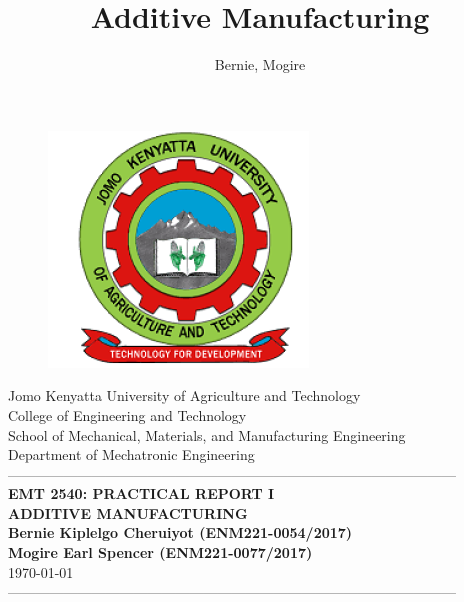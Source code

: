 \documentclass[12pt,fleqn]{report}
\author{Bernie, Mogire}
\title{Additive Manufacturing}
\begin{document}
\begin{titlepage}
  \begin{center}
      \vspace*{-4.0cm}
    \begin{figure}[!h]
\centering
\includegraphics[width=0.3 \linewidth] {Figures/JKUAT_logo}
\label{fig:jomologo}
\end{figure}
   \large{Jomo Kenyatta University of Agriculture and Technology}\\
    \large{College of Engineering and Technology}\\
    \large{School of Mechanical, Materials, and Manufacturing Engineering}\\
   \large{Department of Mechatronic Engineering}\\

    ------------------------------------------------------------------------------------------------\\[1.0cm]
    \LARGE{\textbf{EMT 2540: PRACTICAL REPORT I}}\\[0.6cm]
    \LARGE{\textbf{ADDITIVE MANUFACTURING
            }}\\[1.5cm]

    \vspace{0.5cm}
    \large{\textbf{Bernie Kiplelgo Cheruiyot (ENM221-0054/2017)
            }}\\
     \large{\textbf{Mogire Earl Spencer (ENM221-0077/2017)
            }}\\[1.0cm]
    \large{\small{\today}}\\
    ------------------------------------------------------------------------------------------------\\[1.5cm]
  \end{center}
\end{titlepage}
%
\end{document}
